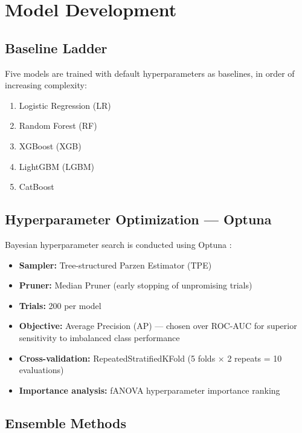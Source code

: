 \documentclass[conference]{IEEEtran}
\begin{document}
\section{Model Development}

\subsection{Baseline Ladder}

Five models are trained with default hyperparameters as baselines, in order of increasing complexity:

\begin{enumerate}
    \item Logistic Regression (LR)
    \item Random Forest (RF)
    \item XGBoost \cite{chen2016} (XGB)
    \item LightGBM \cite{ke2017} (LGBM)
    \item CatBoost
\end{enumerate}

\subsection{Hyperparameter Optimization --- Optuna}

Bayesian hyperparameter search is conducted using Optuna \cite{optuna2019}:

\begin{itemize}
    \item \textbf{Sampler:} Tree-structured Parzen Estimator (TPE)
    \item \textbf{Pruner:} Median Pruner (early stopping of unpromising trials)
    \item \textbf{Trials:} 200 per model
    \item \textbf{Objective:} Average Precision (AP) --- chosen over ROC-AUC for superior sensitivity to imbalanced class performance
    \item \textbf{Cross-validation:} RepeatedStratifiedKFold (5 folds $\times$ 2 repeats = 10 evaluations)
    \item \textbf{Importance analysis:} fANOVA hyperparameter importance ranking
\end{itemize}

\subsection{Ensemble Methods}
\end{document}
